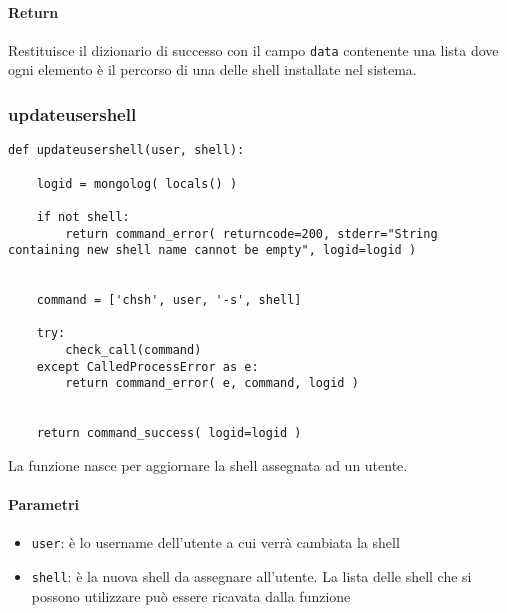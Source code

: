\documentclass[11pt]{article}
\begin{document}
\paragraph{Return}
Restituisce il dizionario di successo con il campo \texttt{data} contenente una lista dove ogni elemento
è il percorso di una delle shell installate nel sistema.

\subsubsection{updateusershell}\label{updateusershell}
\begin{lstlisting}
def updateusershell(user, shell):
	
    logid = mongolog( locals() )
    
    if not shell:
        return command_error( returncode=200, stderr="String containing new shell name cannot be empty", logid=logid )


    command = ['chsh', user, '-s', shell]
    
    try:
        check_call(command)
    except CalledProcessError as e:
        return command_error( e, command, logid )

    
    return command_success( logid=logid )
\end{lstlisting}
La funzione nasce per aggiornare la shell assegnata ad un utente. \paragraph{Parametri}
\begin{itemize}
	\item{\texttt{user}: è lo username dell'utente a cui verrà cambiata la shell}
	\item{\texttt{shell}: è la nuova shell da assegnare all'utente. La lista delle shell che si possono utilizzare
		può essere ricavata dalla funzione }
\end{itemize}
\end{document}
